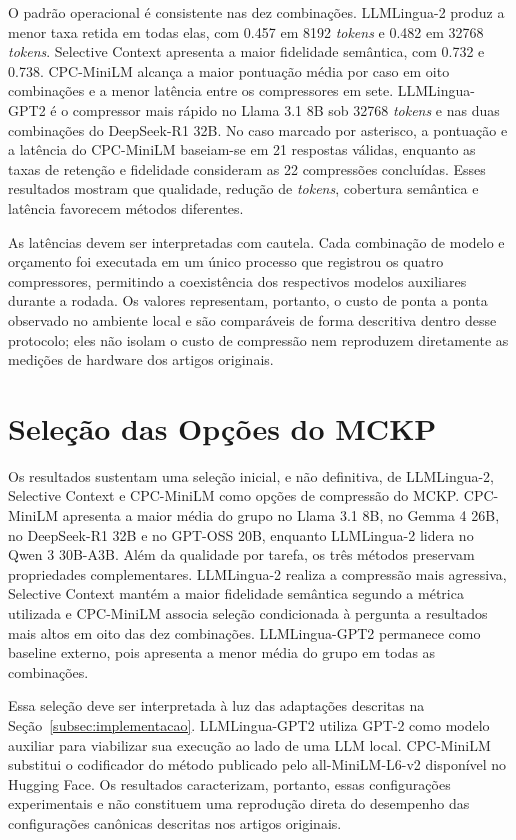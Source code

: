 O padrão operacional é consistente nas dez combinações. LLMLingua-2 produz a menor taxa retida em todas elas, com 0.457 em 8192 \textit{tokens} e 0.482 em 32768 \textit{tokens}. Selective Context apresenta a maior fidelidade semântica, com 0.732 e 0.738. CPC-MiniLM alcança a maior pontuação média por caso em oito combinações e a menor latência entre os compressores em sete. LLMLingua-GPT2 é o compressor mais rápido no Llama 3.1 8B sob 32768 \textit{tokens} e nas duas combinações do DeepSeek-R1 32B. No caso marcado por asterisco, a pontuação e a latência do CPC-MiniLM baseiam-se em 21 respostas válidas, enquanto as taxas de retenção e fidelidade consideram as 22 compressões concluídas. Esses resultados mostram que qualidade, redução de \textit{tokens}, cobertura semântica e latência favorecem métodos diferentes.

As latências devem ser interpretadas com cautela. Cada combinação de modelo e orçamento foi executada em um único processo que registrou os quatro compressores, permitindo a coexistência dos respectivos modelos auxiliares durante a rodada. Os valores representam, portanto, o custo de ponta a ponta observado no ambiente local e são comparáveis de forma descritiva dentro desse protocolo; eles não isolam o custo de compressão nem reproduzem diretamente as medições de hardware dos artigos originais.

\section{Seleção das Opções do MCKP}
\label{sec:posicionamento}

Os resultados sustentam uma seleção inicial, e não definitiva, de LLMLingua-2, Selective Context e CPC-MiniLM como opções de compressão do MCKP. CPC-MiniLM apresenta a maior média do grupo no Llama 3.1 8B, no Gemma 4 26B, no DeepSeek-R1 32B e no GPT-OSS 20B, enquanto LLMLingua-2 lidera no Qwen 3 30B-A3B. Além da qualidade por tarefa, os três métodos preservam propriedades complementares. LLMLingua-2 realiza a compressão mais agressiva, Selective Context mantém a maior fidelidade semântica segundo a métrica utilizada e CPC-MiniLM associa seleção condicionada à pergunta a resultados mais altos em oito das dez combinações. LLMLingua-GPT2 permanece como baseline externo, pois apresenta a menor média do grupo em todas as combinações.

Essa seleção deve ser interpretada à luz das adaptações descritas na Seção~\ref{subsec:implementacao}. LLMLingua-GPT2 utiliza GPT-2 como modelo auxiliar para viabilizar sua execução ao lado de uma LLM local. CPC-MiniLM substitui o codificador do método publicado pelo all-MiniLM-L6-v2 disponível no Hugging Face. Os resultados caracterizam, portanto, essas configurações experimentais e não constituem uma reprodução direta do desempenho das configurações canônicas descritas nos artigos originais.

